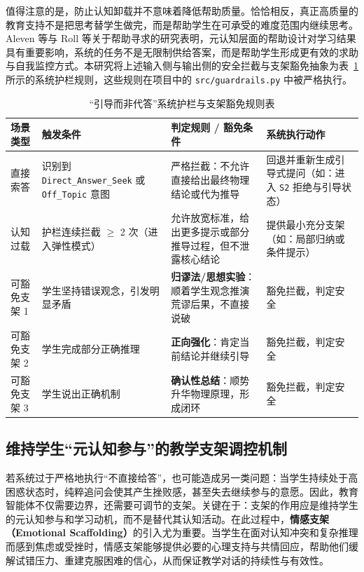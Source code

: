 值得注意的是，防止认知卸载并不意味着降低帮助质量。恰恰相反，真正高质量的教育支持不是把思考替学生做完，而是帮助学生在可承受的难度范围内继续思考。Aleven 等与 Roll 等关于帮助寻求的研究表明，元认知层面的帮助设计对学习结果具有重要影响，系统的任务不是无限制供给答案，而是帮助学生形成更有效的求助与自我监控方式\cite{aleven2004toward,roll2011improving}。本研究将上述输入侧与输出侧的安全拦截与支架豁免抽象为表~\ref{tab:guardrail-rules} 所示的系统护栏规则，这些规则在项目中的 \texttt{src/guardrails.py} 中被严格执行。

\begin{table}[htbp]
    \centering
    \caption{“引导而非代答”系统护栏与支架豁免规则表}
    \label{tab:guardrail-rules}
    \begin{tabular}{p{2.5cm}p{4cm}p{4cm}p{3cm}}
        \hline
        \textbf{场景类型} & \textbf{触发条件} & \textbf{判定规则 / 豁免条件} & \textbf{系统执行动作} \\
        \hline
        直接索答 & 识别到 \texttt{Direct\_Answer\_Seek} 或 \texttt{Off\_Topic} 意图 & 严格拦截：不允许直接给出最终物理结论或代为推导 & 回退并重新生成引导式提问（如：进入 \texttt{S2} 拒绝与引导状态） \\
        认知过载 & 护栏连续拦截 $\ge$ 2 次（进入弹性模式） & 允许放宽标准，给出更多提示或部分推导过程，但不泄露核心结论 & 提供最小充分支架（如：局部归纳或条件提示） \\
        可豁免支架 1 & 学生坚持错误观念，引发明显矛盾 & \textbf{归谬法/思想实验}：顺着学生观念推演荒谬后果，不直接说破 & 豁免拦截，判定安全 \\
        可豁免支架 2 & 学生完成部分正确推理 & \textbf{正向强化}：肯定当前结论并继续引导 & 豁免拦截，判定安全 \\
        可豁免支架 3 & 学生说出正确机制 & \textbf{确认性总结}：顺势升华物理原理，形成闭环 & 豁免拦截，判定安全 \\
        \hline
    \end{tabular}
\end{table}

\subsection{维持学生“元认知参与”的教学支架调控机制}
\label{sec:4.4.2}

若系统过于严格地执行“不直接给答”，也可能造成另一类问题：当学生持续处于高困惑状态时，纯粹追问会使其产生挫败感，甚至失去继续参与的意愿。因此，教育智能体不仅需要边界，还需要可调节的支架。关键在于：支架的作用应是维持学生的元认知参与和学习动机，而不是替代其认知活动。在此过程中，\textbf{情感支架（Emotional Scaffolding）}的引入尤为重要。当学生在面对认知冲突和复杂推理而感到焦虑或受挫时，情感支架能够提供必要的心理支持与共情回应，帮助他们缓解试错压力、重建克服困难的信心，从而保证教学对话的持续性与有效性。

